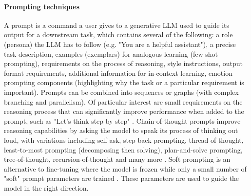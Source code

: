 \documentclass[10pt]{article}
\begin{document}
\paragraph{Prompting techniques} A prompt is a command a user gives to a generative LLM used to guide its output for a downstream task, which contains several of the following: a role (persona) the LLM has to follow (e.g. "You are a helpful assistant"), a precise task description, examples (exemplars) for analogous learning (few-shot prompting), requirements on the process of reasoning, style instructions, output format requirements, additional information for in-context learning, emotion prompting components (highlighting why the task or a particular requirement is important). Prompts can be combined into sequences or graphs (with complex branching and parallelism). Of particular interest are small requirements on the reasoning process that can significantly improve performance when added to the prompt, such as 
"Let’s think step by step" \cite{kojima2022large}. 
Chain-of-thought prompts improve reasoning capabilities by asking the model to speak its process of thinking out loud, with variations including self-ask, step-back prompting, thread-of-thought, least-to-most prompting (decomposing then solving), plan-and-solve prompting, tree-of-thought, recursion-of-thought and many more \cite{schulhoff2024prompt}. 
Soft prompting is an alternative to fine-tuning where the model is frozen while only a small number of "soft" prompt parameters are trained \cite{lester2021prompt}. These parameters are used to guide the model in the right direction.
\end{document}
